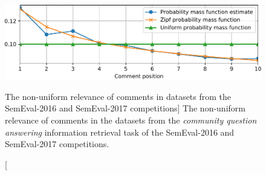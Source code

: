 \begin{figure}
\includegraphics{godwins-law}
\vspace{-0.6cm}
\caption
  [The non-uniform relevance of comments in datasets from the SemEval-2016 and
   SemEval-2017 competitions]%
  {The non-uniform relevance of comments in the datasets from the
   \emph{community question answering} information retrieval task of the
   SemEval-2016 and SemEval-2017 competitions.
   \cite[Figure 2]{novotny2018weighting}}
\label{fig:weighted-zone-scoring}
\end{figure}
